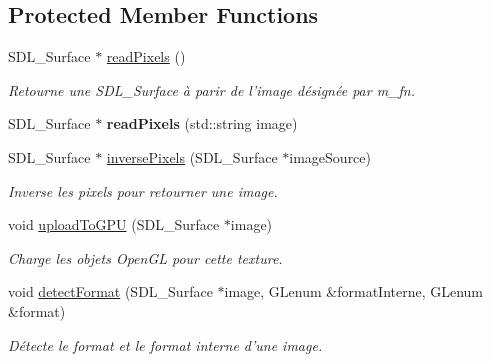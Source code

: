 \subsection*{Protected Member Functions}
\begin{DoxyCompactItemize}
\item 
\hypertarget{classTexture_a2b28225171c8805005b49ba51647369d}{S\+D\+L\+\_\+\+Surface $\ast$ \hyperlink{classTexture_a2b28225171c8805005b49ba51647369d}{read\+Pixels} ()}\label{classTexture_a2b28225171c8805005b49ba51647369d}

\begin{DoxyCompactList}\small\item\em Retourne une S\+D\+L\+\_\+\+Surface à parir de l'image désignée par m\+\_\+fn. \end{DoxyCompactList}\item 
\hypertarget{classTexture_a7f8771fdac09768ef06643ec314d02fb}{S\+D\+L\+\_\+\+Surface $\ast$ {\bfseries read\+Pixels} (std\+::string image)}\label{classTexture_a7f8771fdac09768ef06643ec314d02fb}

\item 
\hypertarget{classTexture_a176dc762ce2e4e7b81ee05998c79beb3}{S\+D\+L\+\_\+\+Surface $\ast$ \hyperlink{classTexture_a176dc762ce2e4e7b81ee05998c79beb3}{inverse\+Pixels} (S\+D\+L\+\_\+\+Surface $\ast$image\+Source)}\label{classTexture_a176dc762ce2e4e7b81ee05998c79beb3}

\begin{DoxyCompactList}\small\item\em Inverse les pixels pour retourner une image. \end{DoxyCompactList}\item 
\hypertarget{classTexture_ad2c6a0ce24d3b8d092abb39d46c41370}{void \hyperlink{classTexture_ad2c6a0ce24d3b8d092abb39d46c41370}{upload\+To\+G\+P\+U} (S\+D\+L\+\_\+\+Surface $\ast$image)}\label{classTexture_ad2c6a0ce24d3b8d092abb39d46c41370}

\begin{DoxyCompactList}\small\item\em Charge les objets Open\+G\+L pour cette texture. \end{DoxyCompactList}\item 
\hypertarget{classTexture_a206c1f87658e5991b722b120cc380ee2}{void \hyperlink{classTexture_a206c1f87658e5991b722b120cc380ee2}{detect\+Format} (S\+D\+L\+\_\+\+Surface $\ast$image, G\+Lenum \&format\+Interne, G\+Lenum \&format)}\label{classTexture_a206c1f87658e5991b722b120cc380ee2}

\begin{DoxyCompactList}\small\item\em Détecte le format et le format interne d'une image. \end{DoxyCompactList}\end{DoxyCompactItemize}
